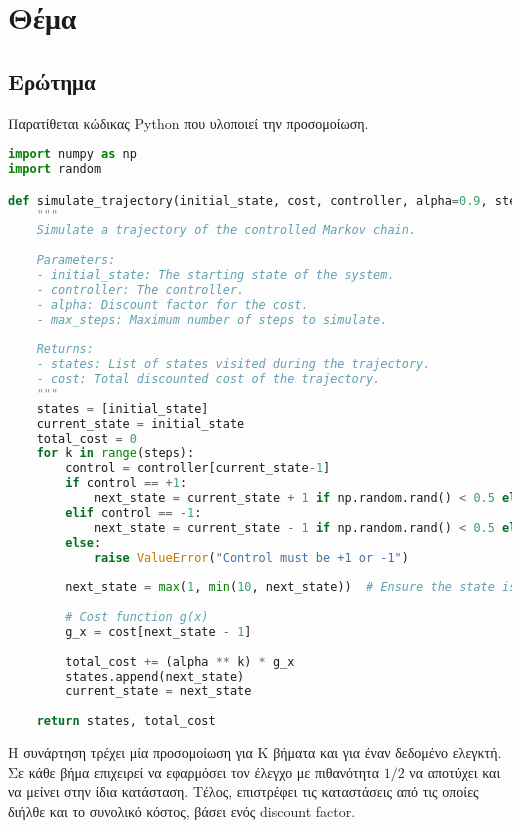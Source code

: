 \documentclass{article}
\newcommand{\eng}[1]{\foreignlanguage{english}{#1}} %
\begin{document}
\section{Θέμα}

\subsection{Ερώτημα}

Παρατίθεται κώδικας \eng{Python} που υλοποιεί την προσομοίωση. 

\begin{lstlisting}[language=Python]
import numpy as np
import random

def simulate_trajectory(initial_state, cost, controller, alpha=0.9, steps=10):
    """
    Simulate a trajectory of the controlled Markov chain.
    
    Parameters:
    - initial_state: The starting state of the system.
    - controller: The controller.
    - alpha: Discount factor for the cost.
    - max_steps: Maximum number of steps to simulate.
    
    Returns:
    - states: List of states visited during the trajectory.
    - cost: Total discounted cost of the trajectory.
    """
    states = [initial_state]
    current_state = initial_state
    total_cost = 0
    for k in range(steps):
        control = controller[current_state-1]
        if control == +1:
            next_state = current_state + 1 if np.random.rand() < 0.5 else current_state
        elif control == -1:
            next_state = current_state - 1 if np.random.rand() < 0.5 else current_state
        else:
            raise ValueError("Control must be +1 or -1")
        
        next_state = max(1, min(10, next_state))  # Ensure the state is within bounds
        
        # Cost function g(x)
        g_x = cost[next_state - 1]
        
        total_cost += (alpha ** k) * g_x
        states.append(next_state)
        current_state = next_state
    
    return states, total_cost
\end{lstlisting}

Η συνάρτηση τρέχει μία προσομοίωση για Κ βήματα και για έναν δεδομένο ελεγκτή.
Σε κάθε βήμα επιχειρεί να εφαρμόσει τον έλεγχο με πιθανότητα $1/2$ να αποτύχει
και να μείνει στην ίδια κατάσταση. Τέλος, επιστρέφει τις καταστάσεις από τις οποίες
διήλθε και το συνολικό κόστος, βάσει ενός \eng{discount factor}.
\end{document}
